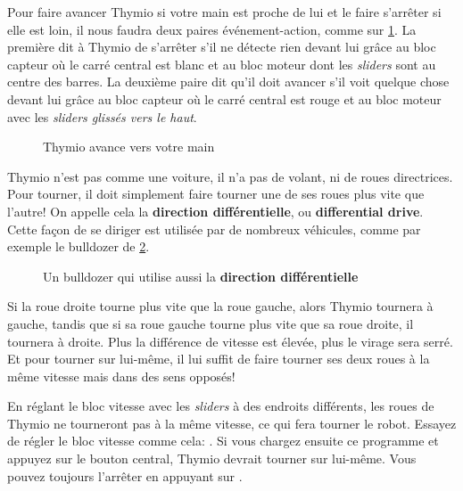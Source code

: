 Pour faire avancer Thymio si votre main est proche de lui et le faire s'arrêter si elle est loin, il nous faudra deux paires événement-action, comme sur \cref{fig.follow-hand}. La première dit à Thymio de s'arrêter s'il ne détecte rien devant lui grâce au bloc capteur où le carré central est blanc et au bloc moteur dont les \textit{sliders} sont au centre des barres. La deuxième paire dit qu'il doit avancer s'il voit quelque chose devant lui grâce au bloc capteur où le carré central est rouge et au bloc moteur avec les \textit{sliders glissés vers le haut}.

\begin{figure}[h]
\begin{center}
\caption{Thymio avance vers votre main}\label{fig.follow-hand}
\end{center}
\end{figure}


Thymio n'est pas comme une voiture, il n'a pas de volant, ni de roues directrices. Pour tourner, il doit simplement faire tourner une de ses roues plus vite que l'autre! On appelle cela la \textbf{direction différentielle}, ou \textbf{differential drive}. Cette façon de se diriger est utilisée par de nombreux véhicules, comme par exemple le bulldozer de \cref{fig.bull}.

\begin{figure}
\begin{center}
\caption{Un bulldozer qui utilise aussi  la \textbf{direction différentielle}}\label{fig.bull}
\end{center}
\end{figure}

Si la roue droite tourne plus vite que la roue gauche, alors Thymio tournera à gauche, tandis que si sa roue gauche tourne plus vite que sa roue droite, il tournera à droite. Plus la différence de vitesse est élevée, plus le virage sera serré. Et pour tourner sur lui-même, il lui suffit de faire tourner ses deux roues à la même vitesse mais dans des sens opposés!

En réglant le bloc vitesse avec les \textit{sliders} à des endroits différents, les roues de Thymio ne tourneront pas à la même vitesse, ce qui fera tourner le robot. Essayez de régler le bloc vitesse comme cela: . Si vous chargez ensuite ce programme et appuyez sur le bouton central, Thymio devrait tourner sur lui-même. Vous pouvez toujours l'arrêter en appuyant sur .

